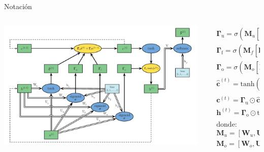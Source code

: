 \documentclass[aspectratio=169]{beamer}
\begin{document}
\begin{frame}{Notación}
	\begin{columns}
		\begin{column}{0.6\textwidth}
			\includegraphics[width=\textwidth, center]{imgs/tema4/rnn/LSTM.pdf}
		\end{column}

		\begin{column}{0.4\textwidth}
			\begin{equation*}
				\begin{aligned}
				& \boldsymbol{\Gamma}_{\mathrm{u}} = \sigma(\mathbf{M}_{u}[\mathbf{h}^{(t-1)}, \mathbf{x}^{(t)}]+\mathbf{b}_{u})\\
				& \boldsymbol{\Gamma}_{\mathrm{f}} = \sigma(\mathbf{M}_{f}[\mathbf{h}^{(t-1)}, \mathbf{x}^{(t)}]+\mathbf{b}_{f})\\
				& \boldsymbol{\Gamma}_{\mathrm{o}} = \sigma(\mathbf{M}_{o}[\mathbf{h}^{(t-1)}, \mathbf{x}^{(t)}]+\mathbf{b}_{o})\\
				& \boldsymbol{\hat{c}}^{(t)} = \text{tanh}(\mathbf{M}_{c}[\mathbf{h}^{(t-1)}, \mathbf{x}^{(t)}]+\mathbf{b}_{c}) \\
				& \boldsymbol{c}^{(t)} = \boldsymbol{\Gamma}_{\mathrm{u}}\odot\boldsymbol{\hat{c}}^{(t)} + \boldsymbol{\Gamma}_{\mathrm{f}} \odot \boldsymbol{c}^{(t-1)} \\
				& \boldsymbol{h}^{(t)} = \boldsymbol{\Gamma}_{\mathrm{o}}\odot\text{tanh}(\boldsymbol{c}^{(t)}) \\[5px]
				& \text{donde:} \\[5px]
				& \mathbf{M}_{u} = [\mathbf{W}_{u}, \mathbf{U}_{u}] \hspace{1em} \mathbf{M}_{f} = [\mathbf{W}_{f}, \mathbf{U}_{f}]\\
				& \mathbf{M}_{o} = [\mathbf{W}_{o}, \mathbf{U}_{o}] \hspace{1em} \mathbf{M}_{c} = [\mathbf{W}_{c}, \mathbf{U}_{c}]\\
				\end{aligned}
			\end{equation*}
		\end{column}
	\end{columns}
\end{frame}
\end{document}
